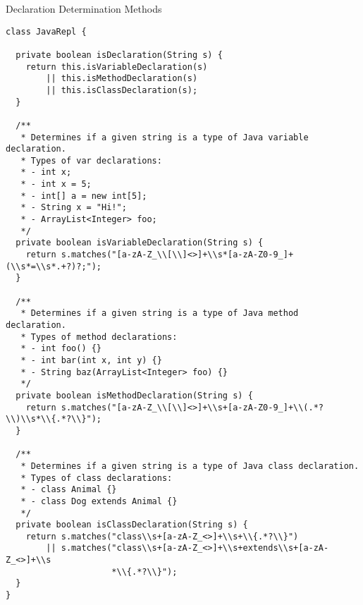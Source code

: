 \begin{cl}{Declaration Determination Methods}
\begin{lstlisting}[language=MyJava]
class JavaRepl {

  private boolean isDeclaration(String s) {
    return this.isVariableDeclaration(s)
        || this.isMethodDeclaration(s)
        || this.isClassDeclaration(s);
  }

  /**
   * Determines if a given string is a type of Java variable declaration.
   * Types of var declarations:
   * - int x;
   * - int x = 5;
   * - int[] a = new int[5];
   * - String x = "Hi!";
   * - ArrayList<Integer> foo;
   */
  private boolean isVariableDeclaration(String s) {
    return s.matches("[a-zA-Z_\\[\\]<>]+\\s*[a-zA-Z0-9_]+(\\s*=\\s*.+?)?;");
  }

  /**
   * Determines if a given string is a type of Java method declaration.
   * Types of method declarations:
   * - int foo() {}
   * - int bar(int x, int y) {}
   * - String baz(ArrayList<Integer> foo) {}
   */
  private boolean isMethodDeclaration(String s) {
    return s.matches("[a-zA-Z_\\[\\]<>]+\\s+[a-zA-Z0-9_]+\\(.*?\\)\\s*\\{.*?\\}");
  }

  /**
   * Determines if a given string is a type of Java class declaration.
   * Types of class declarations:
   * - class Animal {}
   * - class Dog extends Animal {}
   */
  private boolean isClassDeclaration(String s) {
    return s.matches("class\\s+[a-zA-Z_<>]+\\s+\\{.*?\\}") 
        || s.matches("class\\s+[a-zA-Z_<>]+\\s+extends\\s+[a-zA-Z_<>]+\\s
                     *\\{.*?\\}");
  }
}
\end{lstlisting}
\end{cl}

